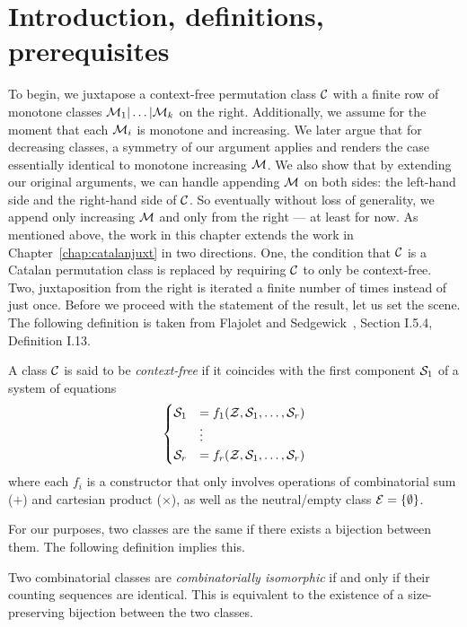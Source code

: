 \documentclass[12pt, a4paper, twoside]{report}
\begin{document}

\section{Introduction, definitions, prerequisites}
\label{sec:iterjuxt_intro}

To begin, we juxtapose a context-free permutation class $\C$ with a finite row of monotone classes $\M_1|\ldots|\M_k$ on the right. Additionally, we assume for the moment that each
$\M_i$ is monotone and increasing. We later argue that for decreasing classes, a symmetry of our argument applies and renders the case essentially identical to monotone increasing $\M$. We also show that by extending our original arguments, we can handle appending $\M$ on both sides: the left-hand side and the right-hand side of $\C$. So eventually without loss of generality, we append only increasing $\M$ and only from the right --- at least for now. As mentioned above, the work in this chapter extends the work in Chapter~\ref{chap:catalanjuxt} in two directions. One, the condition that $\C$ is a Catalan permutation class is replaced by requiring $\C$ to only be context-free. Two, juxtaposition from the right is iterated a finite number of times instead of just once. Before we proceed with the statement of the result, let us set the scene. The following definition is taken from Flajolet and Sedgewick~\cite{analcomb}, Section I.5.4, Definition I.13.
\begin{definition}
  A class $\C$ is said to be \emph{context-free} if it coincides with the first component $\S_1$ of a system of equations
  \begin{align}
  \begin{aligned}
    \begin{cases}
      \S_1 &= f_1(\Z,\S_1,\ldots,\S_r)\\
      &\vdots\\
      \S_r &= f_r(\Z,\S_1,\ldots,\S_r)
    \end{cases}
  \end{aligned}
  \end{align}
  where each $f_i$ is a constructor that only involves operations of combinatorial sum ($+$) and cartesian product ($\times$), as well as the neutral/empty class $\EE = \{\emptyset\}$.
\end{definition}
For our purposes, two classes are the same if there exists a bijection between them. The following definition implies this.
\begin{definition}
  Two combinatorial classes are \emph{combinatorially isomorphic} if and only if their counting sequences are identical. This is equivalent to the existence of a size-preserving bijection between the two classes.
\end{definition}
\end{document}
